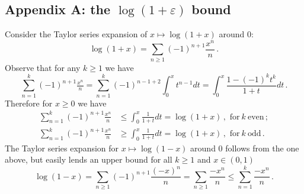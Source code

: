 \documentclass[a4paper,10pt]{article}
\begin{document}
\subsection*{Appendix A: the $\log(1+\varepsilon)$ bound} %
\label{sub:appendix_a_the_log_bound}

Consider the Taylor series expansion of $x\mapsto\log(1 + x)$ around $0$:
$$
    \log(1 + x)
        = \sum_{n\geq 1} (-1)^{n+1} \frac{x^n}{n}
    \,. $$
Observe that for any $k\geq 1$ we have
$$
    \sum_{n=1}^k (-1)^{n+1} \tfrac{x^n}{n}
        = \sum_{n=1}^k (-1)^{n-1+2} \int_0^x t^{n-1} dt
        = \int_0^x \frac{1 - (-1)^k t^k}{1 + t} dt
    \,. $$
Therefore for $x\geq 0$ we have
\begin{align*}
    \sum_{n=1}^k (-1)^{n+1} \tfrac{x^n}{n}
        &
        \leq \int_0^x \frac1{1 + t} dt
        = \log(1+x)
        \,, \text{ for}~k~\text{even}
        \,; \\
    \sum_{n=1}^k (-1)^{n+1} \tfrac{x^n}{n}
        &
        \geq \int_0^x \frac1{1 + t} dt
        = \log(1+x)
        \,, \text{ for}~k~\text{odd}
        \,.
\end{align*}
The Taylor series expansion for $x\mapsto \log(1 - x)$ around $0$ follows from the
one above, but easily lends an upper bound for all $k\geq 1$ and $x \in (0, 1)$
$$
    \log(1 - x)
        = \sum_{n\geq 1} (-1)^{n+1} \frac{(-x)^n}{n}
        = \sum_{n\geq 1} \frac{- x^n}{n}
        \leq \sum_{n=1}^k \frac{- x^n}{n}
    \,. $$


\end{document}
